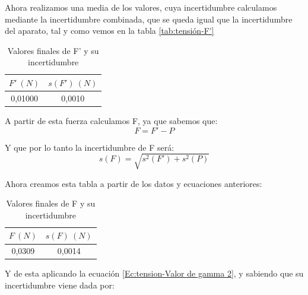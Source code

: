 \documentclass[12pt,a4paper]{book}
\begin{document}
Ahora realizamos una media de los valores, cuya incertidumbre calculamos mediante la incertidumbre combinada, que se queda igual que la incertidumbre del aparato, tal y como vemos en la tabla \ref{tab:tensión-F'} \\

\begin{table}[h!] %
\begin{center}
\begin{tabular}{|c|c|}
\hline
$F' \ (N)$ &  $s(F') \ (N)$ \\ \hline
0,01000 & 0,0010 \\ \hline
\end{tabular}
\caption{Valores finales de F' y su incertidumbre}
\label{tab:valores finales F' a temperatura ambiente}
\end{center}
\end{table}

A partir de esta fuerza calculamos F, ya que sabemos que: \\

\begin{equation}
F=F'-P
\label{Ec:tension-F=F'-P}
\end{equation}

Y que por lo tanto la incertidumbre de F será: \\

\begin{equation}
s(F)=\sqrt{s^2(F')+s^2(P)}
\label{Ec:tension valor de la fuerza de tensión superficial incertidumbre}
\end{equation}

Ahora creamos esta tabla a partir de los datos y ecuaciones anteriores: \\

\begin{table}[h!] %
\begin{center}
\begin{tabular}{|c|c|}
\hline
$F \ (N)$ &  $s(F) \ (N)$ \\ \hline
0,0309 & 0,0014 \\ \hline
\end{tabular}
\caption{Valores finales de F y su incertidumbre}
\label{tab:valores finales F a temperatura ambiente}
\end{center}
\end{table}

Y de esta aplicando la ecuación \ref{Ec:tension-Valor de gamma 2}, y sabiendo que su incertidumbre viene dada por:
\end{document}
